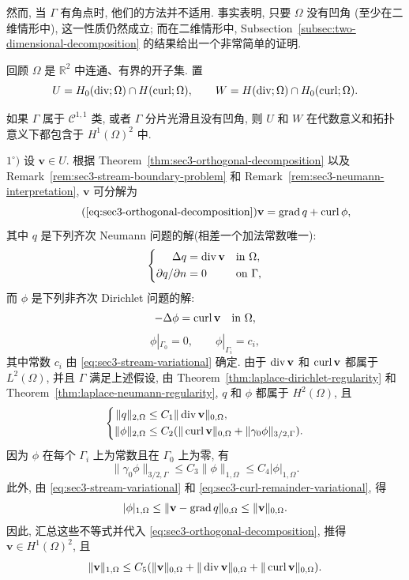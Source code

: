 然而, 当 $\Gamma$ 有角点时, 他们的方法并不适用. 事实表明, 只要 $\Omega$ 没有凹角
(至少在二维情形中), 这一性质仍然成立; 而在二维情形中, Subsection~\ref{subsec:two-dimensional-decomposition}
的结果给出一个非常简单的证明.

回顾 $\Omega$ 是 $\mathbb R^2$ 中连通、有界的开子集. 置
\[
U=H_0(\operatorname{div};\Omega)\cap H(\operatorname{curl};\Omega),
\qquad
W=H(\operatorname{div};\Omega)\cap H_0(\operatorname{curl};\Omega).
\]

\setcounter{statement}{0}
\begin{Proposition}\label{prop:sec3-hdiv-hcurl-h1-inclusion}
如果 $\Gamma$ 属于 $\mathcal C^{1,1}$ 类, 或者 $\Gamma$ 分片光滑且没有凹角,
则 $U$ 和 $W$ 在代数意义和拓扑意义下都包含于 $H^1(\Omega)^2$ 中.
\end{Proposition}
\begin{Proof}
$1^\circ)$ 设 $\mathbf v\in U$. 根据 Theorem~\ref{thm:sec3-orthogonal-decomposition}
以及 Remark~\ref{rem:sec3-stream-boundary-problem} 和
Remark~\ref{rem:sec3-neumann-interpretation}, $\mathbf v$ 可分解为
\begin{equation*}
\tag{\ref*{eq:sec3-orthogonal-decomposition}}
\mathbf v=\Grad q+\Curl\phi,
\end{equation*}
其中 $q$ 是下列齐次 Neumann 问题的解(相差一个加法常数唯一):
\begin{equation}\label{eq:sec3-regularity-neumann}
\left\{\begin{aligned}
\Delta q&=\operatorname{div}\mathbf v&&\text{in }\Omega,\\
\partial q/\partial n&=0&&\text{on }\Gamma,
\end{aligned}\right.
\end{equation}
而 $\phi$ 是下列非齐次 Dirichlet 问题的解:
\[
-\Delta\phi=\operatorname{curl}\mathbf v\quad\text{in }\Omega,
\]
\[
\phi|_{\Gamma_0}=0,
\qquad
\phi|_{\Gamma_i}=c_i,
\]
其中常数 $c_i$ 由 \eqref{eq:sec3-stream-variational} 确定.
由于 $\operatorname{div}\mathbf v$ 和 $\operatorname{curl}\mathbf v$ 都属于 $L^2(\Omega)$, 并且 $\Gamma$
满足上述假设, 由 Theorem~\ref{thm:laplace-dirichlet-regularity} 和
Theorem~\ref{thm:laplace-neumann-regularity}, $q$ 和 $\phi$ 都属于 $H^2(\Omega)$, 且
\begin{equation}\label{eq:sec3-regularity-potential-estimates}
\left\{\begin{aligned}
\|q\|_{2,\Omega}&\le C_1\|\operatorname{div}\mathbf v\|_{0,\Omega},\\
\|\phi\|_{2,\Omega}&\le C_2(\|\operatorname{curl}\mathbf v\|_{0,\Omega}
+\|\gamma_0\phi\|_{3/2,\Gamma}).
\end{aligned}\right.
\end{equation}
因为 $\phi$ 在每个 $\Gamma_i$ 上为常数且在 $\Gamma_0$ 上为零, 有
\[
\|\gamma_0\phi\|_{3/2,\Gamma}
\le C_3\|\phi\|_{1,\Omega}\le C_4|\phi|_{1,\Omega}.
\]
此外, 由 \eqref{eq:sec3-stream-variational} 和
\eqref{eq:sec3-curl-remainder-variational}, 得
\[
|\phi|_{1,\Omega}\le\|\mathbf v-\operatorname{grad} q\|_{0,\Omega}
\le\|\mathbf v\|_{0,\Omega}.
\]
因此, 汇总这些不等式并代入 \eqref{eq:sec3-orthogonal-decomposition}, 推得
$\mathbf v\in H^1(\Omega)^2$, 且
\begin{equation}\label{eq:sec3-hdiv-hcurl-h1-bound}
\|\mathbf v\|_{1,\Omega}\le C_5(\|\mathbf v\|_{0,\Omega}
+\|\operatorname{div}\mathbf v\|_{0,\Omega}+\|\operatorname{curl}\mathbf v\|_{0,\Omega}).
\end{equation}


\end{Proof}
